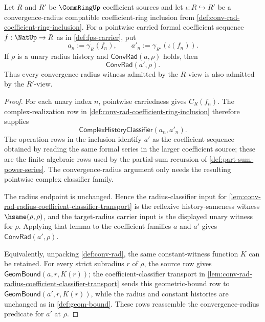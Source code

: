 \begin{theorem}
\label{thm:conv-rad-coefficient-ring-inclusion-monotone}
Let $R$ and $R'$ be $\CommRingUp$ coefficient sources and let $\iota:R\hookrightarrow R'$ be a convergence-radius compatible coefficient-ring inclusion from \autoref{def:conv-rad-coefficient-ring-inclusion}. For a pointwise carried formal coefficient sequence $f:\NatUp\to R$ as in \autoref{def:fps-carrier}, put
$$
a_n:=\gamma_R(f_n),\qquad a'_n:=\gamma_{R'}(\iota(f_n)).
$$
If $\rho$ is a unary radius history and $\mathsf{ConvRad}(a,\rho)$ holds, then
$$
\mathsf{ConvRad}(a',\rho).
$$
Thus every convergence-radius witness admitted by the $R$-view is also admitted by the $R'$-view.
\end{theorem}
\begin{proof}
For each unary index $n$, pointwise carriedness gives $C_R(f_n)$. The complex-realization row in \autoref{def:conv-rad-coefficient-ring-inclusion} therefore supplies
$$
\mathsf{ComplexHistoryClassifier}(a_n,a'_n).
$$
The operation rows in the inclusion identify $a'$ as the coefficient sequence obtained by reading the same formal series in the larger coefficient source; these are the finite algebraic rows used by the partial-sum recursion of \autoref{def:part-sum-power-series}. The convergence-radius argument only needs the resulting pointwise complex classifier family.

The radius endpoint is unchanged. Hence the radius-classifier input for \autoref{lem:conv-rad-radius-coefficient-classifier-transport} is the reflexive history-sameness witness $\hsame(\rho,\rho)$, and the target-radius carrier input is the displayed unary witness for $\rho$. Applying that lemma to the coefficient families $a$ and $a'$ gives $\mathsf{ConvRad}(a',\rho)$.

Equivalently, unpacking \autoref{def:conv-rad}, the same constant-witness function $K$ can be retained. For every strict subradius $r$ of $\rho$, the source row gives $\mathsf{GeomBound}(a,r,K(r))$; the coefficient-classifier transport in \autoref{lem:conv-rad-radius-coefficient-classifier-transport} sends this geometric-bound row to $\mathsf{GeomBound}(a',r,K(r))$, while the radius and constant histories are unchanged as in \autoref{def:geom-bound}. These rows reassemble the convergence-radius predicate for $a'$ at $\rho$.
\end{proof}
